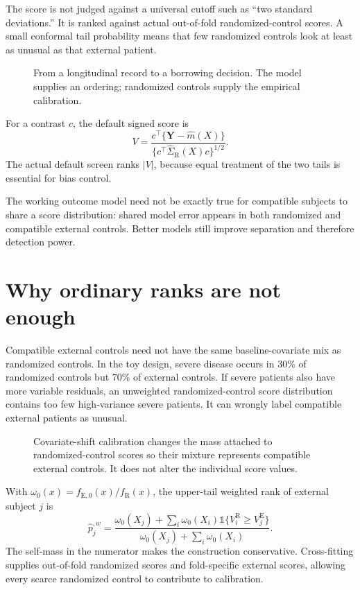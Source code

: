 \documentclass[10pt]{article}
\newcommand{\R}{\mathrm{R}}
\newcommand{\E}{\mathrm{E}}
\newcommand{\ind}{\mathbb{1}}
\newcommand{\fullfig}[1]{\resizebox{\linewidth}{!}{}}
\begin{document}
The score is not judged against a universal cutoff such as ``two standard deviations.'' It is ranked against actual out-of-fold randomized-control scores. A small conformal tail probability means that few randomized controls look at least as unusual as that external patient.

\begin{figure}[!h]
\centering\fullfig{score_pipeline.tex}
\caption{From a longitudinal record to a borrowing decision. The model supplies an ordering; randomized controls supply the empirical calibration.}
\end{figure}

For a contrast $c$, the default signed score is
\[
V=\frac{c^\top\{\bm Y-\widehat m(X)\}}
        {\{c^\top\widehat\Sigma_{\R}(X)c\}^{1/2}}.
\]
The actual default screen ranks $|V|$, because equal treatment of the two tails is essential for bias control.

\begin{takeaway}
The working outcome model need not be exactly true for compatible subjects to share a score distribution: shared model error appears in both randomized and compatible external controls. Better models still improve separation and therefore detection power.
\end{takeaway}

\clearpage
\section{Why ordinary ranks are not enough}

Compatible external controls need not have the same baseline-covariate mix as randomized controls. In the toy design, severe disease occurs in 30\% of randomized controls but 70\% of external controls. If severe patients also have more variable residuals, an unweighted randomized-control score distribution contains too few high-variance severe patients. It can wrongly label compatible external patients as unusual.

\begin{figure}[!h]
\centering\fullfig{covariate_shift.tex}
\caption{Covariate-shift calibration changes the mass attached to randomized-control scores so their mixture represents compatible external controls. It does not alter the individual score values.}
\end{figure}

With $\omega_0(x)=f_{\E,0}(x)/f_\R(x)$, the upper-tail weighted rank of external subject $j$ is
\[
\widehat p^{,w}_j=
\frac{\omega_0(X_j)+\sum_i\omega_0(X_i)\ind\{V_i^\R\ge V_j^\E\}}
     {\omega_0(X_j)+\sum_i\omega_0(X_i)}.
\]
The self-mass in the numerator makes the construction conservative. Cross-fitting supplies out-of-fold randomized scores and fold-specific external scores, allowing every scarce randomized control to contribute to calibration.
\end{document}
